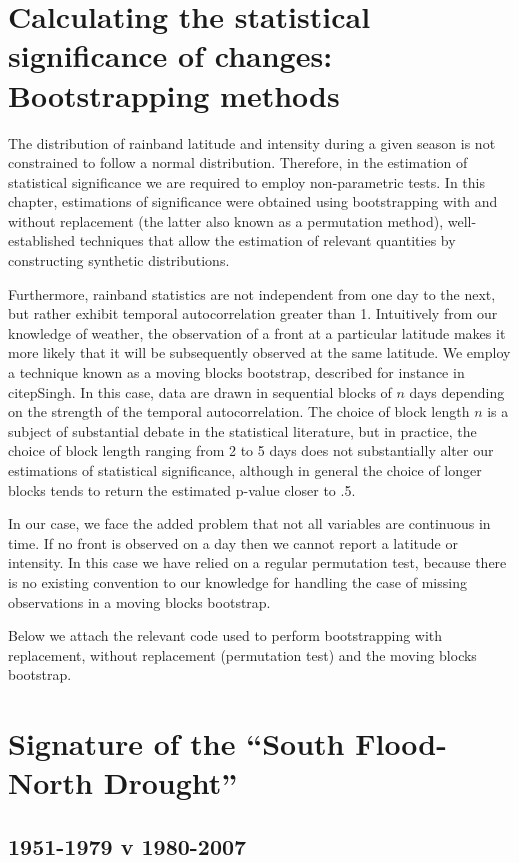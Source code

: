 \section{Calculating the statistical significance of changes: Bootstrapping methods}
The distribution of rainband latitude and intensity during a given season is not constrained to follow a normal distribution. Therefore, in the estimation of statistical significance we are required to employ non-parametric tests. In this chapter, estimations of significance were obtained using bootstrapping with and without replacement (the latter also known as a permutation method), well-established techniques that allow the estimation of relevant quantities by constructing synthetic distributions.

Furthermore, rainband statistics are not independent from one day to the next, but rather exhibit temporal autocorrelation greater than 1. Intuitively from our knowledge of weather, the observation of a front at a particular latitude makes it more likely that it will be subsequently observed at the same latitude. We employ a technique known as a moving blocks bootstrap, described for instance in citep{Singh}. In this case, data are drawn in sequential blocks of $n$ days depending on the strength of the temporal autocorrelation. The choice of block length $n$ is a subject of substantial debate in the statistical literature, but in practice, the choice of block length ranging from 2 to 5 days does not substantially alter our estimations of statistical significance, although in general the choice of longer blocks tends to return the estimated p-value closer to .5.

In our case, we face the added problem that not all variables are continuous in time. If no front is observed on a day then we cannot report a latitude or intensity. In this case we have relied on a regular permutation test, because there is no existing convention to our knowledge for handling the case of missing observations in a moving blocks bootstrap.

Below we attach the relevant code used to perform bootstrapping with replacement, without replacement (permutation test) and the moving blocks bootstrap.

\section{Signature of the ``South Flood-North Drought''}
\subsection{1951-1979 v 1980-2007}
